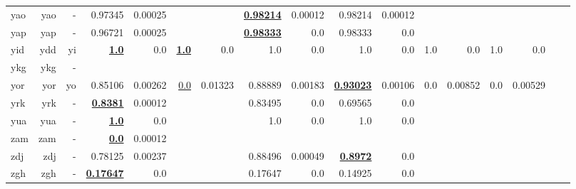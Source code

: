 \documentclass[11pt]{article}
\begin{document}
\begin{table*}[h]
{\begin{tabular}{lrrrrrrrrrrrrrrrr}
yao         & yao         & -         & 0.97345         & 0.00025         &          &          & \textbf{\underline{0.98214}}         & 0.00012         & 0.98214         & 0.00012         &          &          &          &          \\
yap         & yap         & -         & 0.96721         & 0.00025         &          &          & \textbf{\underline{0.98333}}         & 0.0         & 0.98333         & 0.0         &          &          &          &          \\
yid         & ydd         & yi         & \textbf{\underline{1.0}}         & 0.0         & \textbf{\underline{1.0}}         & 0.0         & 1.0         & 0.0         & 1.0         & 0.0         & 1.0         & 0.0         & 1.0         & 0.0         \\
ykg         & ykg         & -         &          &          &          &          &          &          &          &          &          &          &          &          \\
yor         & yor         & yo         & 0.85106         & 0.00262         & \underline{0.0}         & 0.01323         & 0.88889         & 0.00183         & \textbf{\underline{0.93023}}         & 0.00106         & 0.0         & 0.00852         & 0.0         & 0.00529         \\
yrk         & yrk         & -         & \textbf{\underline{0.8381}}         & 0.00012         &          &          & 0.83495         & 0.0         & 0.69565         & 0.0         &          &          &          &          \\
yua         & yua         & -         & \textbf{\underline{1.0}}         & 0.0         &          &          & 1.0         & 0.0         & 1.0         & 0.0         &          &          &          &          \\
zam         & zam         & -         & \textbf{\underline{0.0}}         & 0.00012         &          &          &          &          &          &          &          &          &          &          \\
zdj         & zdj         & -         & 0.78125         & 0.00237         &          &          & 0.88496         & 0.00049         & \textbf{\underline{0.8972}}         & 0.0         &          &          &          &          \\
zgh         & zgh         & -         & \textbf{\underline{0.17647}}         & 0.0         &          &          & 0.17647         & 0.0         & 0.14925         & 0.0         &          &          &          &          \\

\end{tabular}}
\end{table*}
\end{document}

